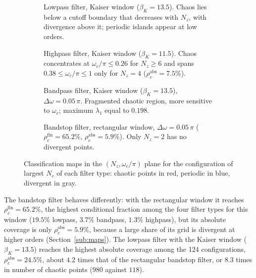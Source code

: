 \documentclass[journal]{IEEEtran}
\begin{document}
\begin{figure}[!t]
\centering
\begin{subfigure}[t]{0.48\textwidth}
\centering

\caption{Lowpass filter, Kaiser window ($\beta_K=13.5$). Chaos lies below a
cutoff boundary that decreases with $N_z$, with divergence above it; periodic
islands appear at low orders.}
\label{fig:lowpass}
\end{subfigure}
\hfill
\begin{subfigure}[t]{0.48\textwidth}
\centering

\caption{Highpass filter, Kaiser window ($\beta_K=11.5$). Chaos concentrates at
$\omega_c/\pi\le0.26$ for $N_z\ge6$ and spans $0.38\le\omega_c/\pi\le1$ only
for $N_z=4$ ($\rho_c^{\text{abs}}=7.5\%$).}
\label{fig:highpass}
\end{subfigure}

\vspace{1.5ex}
\begin{subfigure}[t]{0.48\textwidth}
\centering

\caption{Bandpass filter, Kaiser window ($\beta_K=13.5$), $\Delta\omega=0.05\,\pi$.
Fragmented chaotic region, more sensitive to $\omega_c$; maximum $\lambda_1$
equal to $0.198$.}
\label{fig:bandpass}
\end{subfigure}
\hfill
\begin{subfigure}[t]{0.48\textwidth}
\centering

\caption{Bandstop filter, rectangular window, $\Delta\omega=0.05\,\pi$
($\rho_c^{\text{fin}}=65.2\%$, $\rho_c^{\text{abs}}=5.9\%$). Only $N_z=2$ has no
divergent points.}
\label{fig:bandstop}
\end{subfigure}
\caption{Classification maps in the $(N_z,\omega_c/\pi)$ plane for the
configuration of largest $N_c$ of each filter type: chaotic points in red,
periodic in blue, divergent in gray.}
\label{fig:maps}
\end{figure}

The bandstop filter behaves differently: with the rectangular window it
reaches $\rho_c^{\text{fin}}=65.2\%$, the highest conditional fraction among
the four filter types for this window ($19.5\%$ lowpass, $3.7\%$ bandpass,
$1.3\%$ highpass), but its absolute coverage is only
$\rho_c^{\text{abs}}=5.9\%$, because a large share of its grid is divergent at
higher orders (Section~\ref{sub:maps}). The lowpass filter with the Kaiser window
($\beta_K=13.5$) reaches the highest absolute coverage among the 124
configurations, $\rho_c^{\text{abs}}=24.5\%$, about $4.2$ times that of the
rectangular bandstop filter, or $8.3$ times in number of chaotic points ($980$
against $118$).
\end{document}
